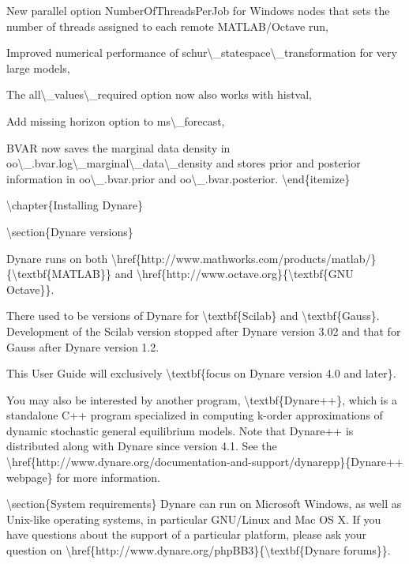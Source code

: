 \documentclass[10pt,math=newtx,citestyle=gb7714-2015,bibstyle=gb7714-2015]{elegantbook}
\begin{document}
	
	New parallel option NumberOfThreadsPerJob for Windows nodes that sets the number of threads assigned to each remote MATLAB/Octave run,
	
	
	Improved numerical performance of schur\textbackslash{}\_statespace\textbackslash{}\_transformation for very large models,
	
	
	The all\textbackslash{}\_values\textbackslash{}\_required option now also works with histval,
	
	
	Add missing horizon option to ms\textbackslash{}\_forecast,
	
	
	BVAR now saves the marginal data density in oo\textbackslash{}\_.bvar.log\textbackslash{}\_marginal\textbackslash{}\_data\textbackslash{}\_density and stores prior and posterior information in oo\textbackslash{}\_.bvar.prior and oo\textbackslash{}\_.bvar.posterior.
	\textbackslash{}end\{itemize\}
	
	
	
	
	\textbackslash{}chapter\{Installing Dynare\}
	
	\textbackslash{}section\{Dynare versions\}
	
	Dynare runs on both \textbackslash{}href\{http://www.mathworks.com/products/matlab/\}\{\textbackslash{}textbf\{MATLAB\}\} and \textbackslash{}href\{http://www.octave.org\}\{\textbackslash{}textbf\{GNU Octave\}\}.
	
	There used to be versions of Dynare for \textbackslash{}textbf\{Scilab\} and \textbackslash{}textbf\{Gauss\}. Development of the Scilab version stopped after Dynare version 3.02 and that for Gauss after Dynare version 1.2.
	
	This User Guide will exclusively \textbackslash{}textbf\{focus on Dynare version 4.0 and later\}.
	
	You may also be interested by another program, \textbackslash{}textbf\{Dynare++\}, which is a standalone C++ program specialized in computing k-order approximations of dynamic stochastic general equilibrium models. Note that Dynare++ is distributed along with Dynare since version 4.1. See the \textbackslash{}href\{http://www.dynare.org/documentation-and-support/dynarepp\}\{Dynare++ webpage\} for more information. 
	
	\textbackslash{}section\{System requirements\}
	Dynare can run on Microsoft Windows, as well as Unix-like operating systems, in particular GNU/Linux and Mac OS X. If you have questions about the support of a particular platform, please ask your question on \textbackslash{}href\{http://www.dynare.org/phpBB3\}\{\textbackslash{}textbf\{Dynare forums\}\}.
	
\end{document}
